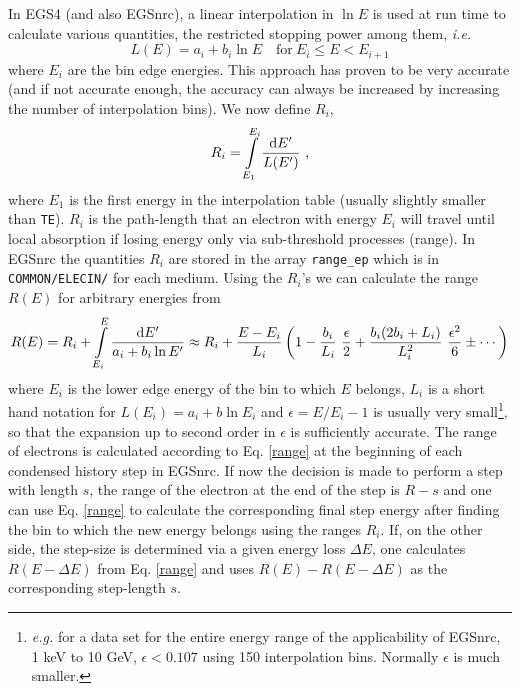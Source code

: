 In EGS4 (and also EGSnrc), a linear interpolation in $\ln E$ is
used at run time to calculate various quantities, the restricted
stopping power among them, {\em i.e.}
\begin{equation}
\label{L_interpolation}
L(E) = a_i + b_i \ln E \quad \text{for}~ E_i \le E < E_{i+1}
\end{equation}
where $E_i$ are the bin edge energies. This approach has
proven to be very accurate (and if not accurate enough,
the accuracy can always be increased by increasing the
number of interpolation bins). We now define $R_i$,
\begin{equation}
R_i = \int\limits_{E_1}^{E_i} {{\rm d} E' \over L(E')}~,
\end{equation}
where $E_1$ is the first energy in the interpolation table
(usually slightly smaller than {\tt TE}). $R_i$ is
the path-length that an electron with energy $E_i$ will
travel until local absorption if losing energy only
via sub-threshold processes (range).
In EGSnrc the quantities $R_i$ are stored in the array
{\tt range\_ep} which is in {\tt COMMON/ELECIN/} for each
medium. Using the $R_i$'s we can calculate the range
$R(E)$ for arbitrary energies from
 
\begin{equation}
\label{range}
R(E) = R_i + \int\limits_{E_i}^E {{\rm d}E' \over a_i + b_i \ln E'}
\approx R_i + {E - E_i \over L_i} \left(1 -
{b_i \over L_i}~{\epsilon \over 2} + {b_i (2 b_i + L_i) \over L_i^2}~
{\epsilon^2 \over 6} \pm \cdots \right)
\end{equation}
where $E_i$ is the lower edge energy of the bin to which $E$ belongs,
$L_i$ is a short hand notation for $L(E_i) = a_i + b \ln E_i$
and $\epsilon = E/E_i - 1$ is usually very small\footnote{{\em e.g.} for a
data set for the entire energy range of the applicability
of EGSnrc, 1 keV to 10 GeV, $\epsilon < 0.107$ using 150 interpolation
bins. Normally $\epsilon$ is much smaller.}, so that
the expansion up to second order in $\epsilon$ is sufficiently
accurate. The range of electrons is calculated according to Eq.
\eqref{range} at the beginning of each condensed history step in
EGSnrc. If now the decision is made to perform a step with
length $s$, the range of the electron at the end of the step
is $R - s$ and one can use Eq. \eqref{range} to
calculate the corresponding final step energy after finding
the bin to which the new energy belongs using the ranges
$R_i$. If, on the other side,
the step-size is determined via a given energy loss
$\Delta E$, one calculates $R(E - \Delta E)$ from
Eq. \eqref{range} and uses $R(E) - R(E - \Delta E)$  as the
corresponding step-length $s$.

